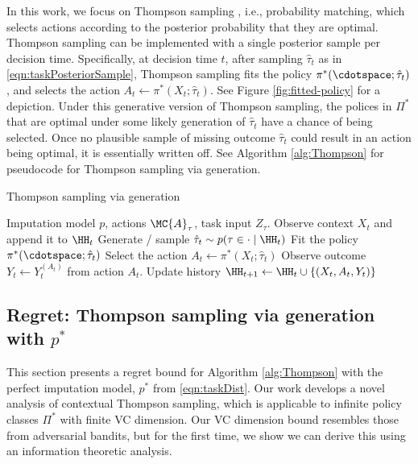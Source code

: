 In this work, we focus on Thompson sampling \citep{russo2016information,thompson1933likelihood}, i.e., probability matching, which selects actions according to the posterior probability that they are optimal. Thompson sampling can be implemented with a single posterior sample per decision time. Specifically, at decision time $t$, after sampling $\hat{\tau}_t$ as in \eqref{eqn:taskPosteriorSample}, Thompson sampling fits the policy $\pi^*(\cdotspace; \hat{\tau}_t)$, and selects the action $A_t \gets \pi^*(X_t; \hat{\tau}_t)$. See Figure \ref{fig:fitted-policy} for a depiction.
Under this generative version of Thompson sampling, the polices in $\Pi^*$ that are optimal under some likely generation of $\hat{\tau}_t$ have a chance of being selected. Once no plausible sample of missing outcome $\hat{\tau}_t$ could result in an action being optimal, it is essentially written off. 
See Algorithm \ref{alg:Thompson} for pseudocode for Thompson sampling via generation.

\begin{algorithm}[h]
\caption{Thompson sampling via generation}
\label{alg:Thompson}
\begin{algorithmic}[1]
   \REQUIRE Imputation model $p$, actions $\MC{A}_{\tau}$, task input $Z_{\tau}$.
        \STATE Observe context $X_t$ and append it to $\HH_t$
        \STATE Generate / sample $\hat{\tau}_t \sim p( \tau \in \cdot \mid \HH_t)$
        \STATE Fit the policy $\pi^*(\cdotspace; \hat{\tau}_t)$ %
        \STATE Select the action $A_t \gets \pi^*(X_t; \hat{\tau}_t)$
        \STATE Observe outcome $Y_t \gets Y_t^{(A_t)}$ from action $A_t$.
        \STATE Update history $\HH_{t+1} \gets \HH_t \cup \{ (X_t, A_t, Y_t)\}$ 
   \ENDFOR
\end{algorithmic}
\end{algorithm}


\subsection{Regret: Thompson sampling via generation with $p^*$}
\label{sec:regret-perfect}
This section presents a regret bound for Algorithm \ref{alg:Thompson} with the perfect imputation model, $p^*$ from \eqref{eqn:taskDist}. Our work develops a novel analysis of contextual Thompson sampling, which is applicable to infinite policy classes $\Pi^*$ with finite VC dimension. Our VC dimension bound resembles those from adversarial bandits, but for the first time, we show we can derive this using an information theoretic analysis.

